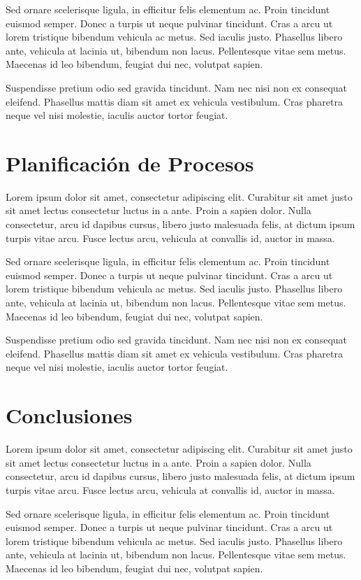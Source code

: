 \documentclass[conference]{IEEEtran}
\begin{document}
Sed ornare scelerisque ligula, in efficitur felis elementum ac. Proin tincidunt euismod semper. Donec a turpis ut neque pulvinar tincidunt. Cras a arcu ut lorem tristique bibendum vehicula ac metus. Sed iaculis justo. Phasellus libero ante, vehicula at lacinia ut, bibendum non lacus. Pellentesque vitae sem metus. Maecenas id leo bibendum, feugiat dui nec, volutpat sapien.
 
Suspendisse pretium odio sed gravida tincidunt. Nam nec nisi non ex consequat eleifend. Phasellus mattis diam sit amet ex vehicula vestibulum. Cras pharetra neque vel nisi molestie, iaculis auctor tortor feugiat.


\section{Planificación de Procesos}
\label{sec:planificacion}

Lorem ipsum dolor sit amet, consectetur adipiscing elit. Curabitur sit amet justo sit amet lectus consectetur luctus in a ante. Proin a sapien dolor. Nulla consectetur, arcu id dapibus cursus, libero justo malesuada felis, at dictum ipsum turpis vitae arcu. Fusce lectus arcu, vehicula at convallis id, auctor in massa.

Sed ornare scelerisque ligula, in efficitur felis elementum ac. Proin tincidunt euismod semper. Donec a turpis ut neque pulvinar tincidunt. Cras a arcu ut lorem tristique bibendum vehicula ac metus. Sed iaculis justo. Phasellus libero ante, vehicula at lacinia ut, bibendum non lacus. Pellentesque vitae sem metus. Maecenas id leo bibendum, feugiat dui nec, volutpat sapien.
 
Suspendisse pretium odio sed gravida tincidunt. Nam nec nisi non ex consequat eleifend. Phasellus mattis diam sit amet ex vehicula vestibulum. Cras pharetra neque vel nisi molestie, iaculis auctor tortor feugiat.

\section{Conclusiones}
\label{sec:conclusiones}

Lorem ipsum dolor sit amet, consectetur adipiscing elit. Curabitur sit amet justo sit amet lectus consectetur luctus in a ante. Proin a sapien dolor. Nulla consectetur, arcu id dapibus cursus, libero justo malesuada felis, at dictum ipsum turpis vitae arcu. Fusce lectus arcu, vehicula at convallis id, auctor in massa.

Sed ornare scelerisque ligula, in efficitur felis elementum ac. Proin tincidunt euismod semper. Donec a turpis ut neque pulvinar tincidunt. Cras a arcu ut lorem tristique bibendum vehicula ac metus. Sed iaculis justo. Phasellus libero ante, vehicula at lacinia ut, bibendum non lacus. Pellentesque vitae sem metus. Maecenas id leo bibendum, feugiat dui nec, volutpat sapien.
\end{document}
